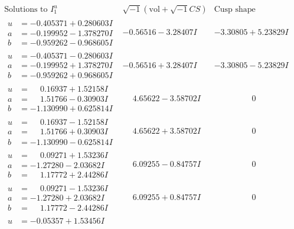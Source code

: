 \documentclass[1p]{elsarticle_modified}
\theoremstyle{definition}
\newcommand{\I}{\sqrt{-1}}
\begin{document}
$$\begin{array}{c|c|c}
\text{Solutions to }I^u_{1}& \I (\text{vol} + \sqrt{-1}CS) & \text{Cusp shape}\\
 \hline 
\begin{aligned}
u &= -0.405371 + 0.280603 I \\
a &= -0.199952 - 1.378270 I \\
b &= -0.959262 - 0.968605 I\end{aligned}
 & -0.56516 - 3.28407 I & -3.30805 + 5.23829 I \\ \hline\begin{aligned}
u &= -0.405371 - 0.280603 I \\
a &= -0.199952 + 1.378270 I \\
b &= -0.959262 + 0.968605 I\end{aligned}
 & -0.56516 + 3.28407 I & -3.30805 - 5.23829 I \\ \hline\begin{aligned}
u &= \phantom{-}0.16937 + 1.52158 I \\
a &= \phantom{-}1.51766 - 0.30903 I \\
b &= -1.130990 + 0.625814 I\end{aligned}
 & \phantom{-}4.65622 - 3.58702 I & \phantom{-0.000000 } 0 \\ \hline\begin{aligned}
u &= \phantom{-}0.16937 - 1.52158 I \\
a &= \phantom{-}1.51766 + 0.30903 I \\
b &= -1.130990 - 0.625814 I\end{aligned}
 & \phantom{-}4.65622 + 3.58702 I & \phantom{-0.000000 } 0 \\ \hline\begin{aligned}
u &= \phantom{-}0.09271 + 1.53236 I \\
a &= -1.27280 - 2.03682 I \\
b &= \phantom{-}1.17772 + 2.44286 I\end{aligned}
 & \phantom{-}6.09255 - 0.84757 I & \phantom{-0.000000 } 0 \\ \hline\begin{aligned}
u &= \phantom{-}0.09271 - 1.53236 I \\
a &= -1.27280 + 2.03682 I \\
b &= \phantom{-}1.17772 - 2.44286 I\end{aligned}
 & \phantom{-}6.09255 + 0.84757 I & \phantom{-0.000000 } 0 \\ \hline\begin{aligned}
u &= -0.05357 + 1.53456 I \\

\end{aligned}
\end{array}$$
\end{document}
